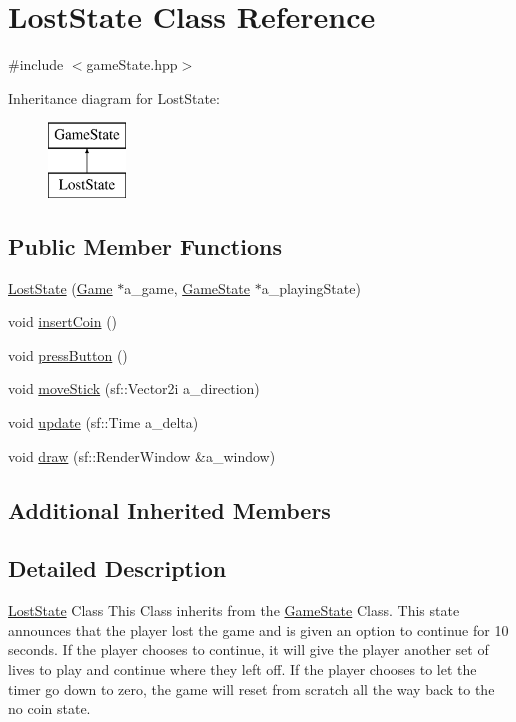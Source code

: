 \hypertarget{class_lost_state}{}\section{Lost\+State Class Reference}
\label{class_lost_state}


{\ttfamily \#include $<$game\+State.\+hpp$>$}

Inheritance diagram for Lost\+State\+:\begin{figure}[H]
\begin{center}
\leavevmode
\includegraphics[height=2.000000cm]{class_lost_state}
\end{center}
\end{figure}
\subsection*{Public Member Functions}
\begin{DoxyCompactItemize}
\item 
\hyperlink{class_lost_state_a92bfadd289d793b53b4395510d35f052}{Lost\+State} (\hyperlink{class_game}{Game} $\ast$a\+\_\+game, \hyperlink{class_game_state}{Game\+State} $\ast$a\+\_\+playing\+State)
\item 
void \hyperlink{class_lost_state_aa35179942033d9ab54fbcd7122f40497}{insert\+Coin} ()
\item 
void \hyperlink{class_lost_state_ab0ec749961cfe909dc61289d14444a71}{press\+Button} ()
\item 
void \hyperlink{class_lost_state_abc978a14604451eee5e0373b4ad374c8}{move\+Stick} (sf\+::\+Vector2i a\+\_\+direction)
\item 
void \hyperlink{class_lost_state_a16d5e12284d03f8dd6b25a897b25839b}{update} (sf\+::\+Time a\+\_\+delta)
\item 
void \hyperlink{class_lost_state_acfdefa77d7ed756a1052d39ed2de8786}{draw} (sf\+::\+Render\+Window \&a\+\_\+window)
\end{DoxyCompactItemize}
\subsection*{Additional Inherited Members}


\subsection{Detailed Description}
\hyperlink{class_lost_state}{Lost\+State} Class This Class inherits from the \hyperlink{class_game_state}{Game\+State} Class. This state announces that the player lost the game and is given an option to continue for 10 seconds. If the player chooses to continue, it will give the player another set of lives to play and continue where they left off. If the player chooses to let the timer go down to zero, the game will reset from scratch all the way back to the no coin state. 

